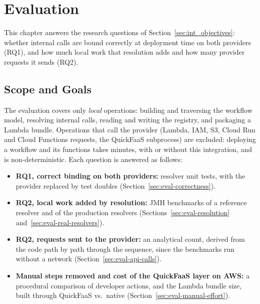 %
%
%
\chapter{Evaluation}
\label{cha:evaluation}
\renewcommand{\topfraction}{0.9}
\renewcommand{\textfraction}{0.1}
\renewcommand{\floatpagefraction}{0.8}

This chapter answers the research questions of Section~\ref{sec:int_objectives}: whether internal
calls are bound correctly at deployment time on both providers (RQ1), and how much local work that
resolution adds and how many provider requests it sends (RQ2).

\section{Scope and Goals}
\label{sec:eval-scope}

The evaluation covers only \emph{local} operations: building and traversing the workflow model,
resolving internal calls, reading and writing the registry, and packaging a Lambda bundle.
Operations that call the provider (Lambda, IAM, S3, Cloud Run and Cloud Functions requests, the
QuickFaaS subprocess) are excluded: deploying a workflow and its functions takes minutes, with or
without this integration, and is non-deterministic. Each question is answered as follows:

\begin{itemize}
  \item \textbf{RQ1, correct binding on both providers:} resolver unit tests, with the provider
  replaced by test doubles (Section~\ref{sec:eval-correctness}).
  \item \textbf{RQ2, local work added by resolution:} JMH benchmarks of a reference resolver and of
  the production resolvers (Sections~\ref{sec:eval-resolution} and~\ref{sec:eval-real-resolvers}).
  \item \textbf{RQ2, requests sent to the provider:} an analytical count, derived from the code
  path by path through the sequence, since the benchmarks run without a network
  (Section~\ref{sec:eval-api-calls}).
  \item \textbf{Manual steps removed and cost of the QuickFaaS layer on AWS:} a procedural comparison
  of developer actions, and the Lambda bundle size, built through QuickFaaS vs.\ native
  (Section~\ref{sec:eval-manual-effort}).
\end{itemize}

